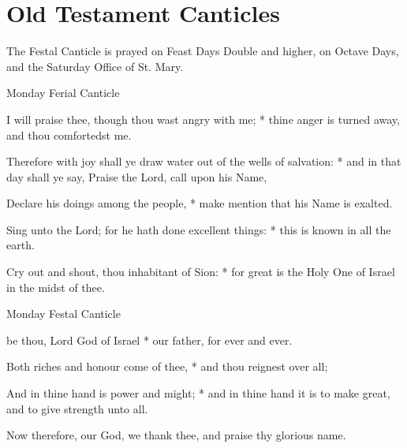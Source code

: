 \section{Old Testament Canticles}\label{OT}
\begin{rubric}
    The Festal Canticle is prayed on Feast Days Double and higher, on Octave Days, and the Saturday Office of St. Mary.
\end{rubric}
\begin{multicols}{2}
\begin{inhead}
Monday Ferial Canticle
\end{inhead}
 I will praise thee, though thou wast angry with me; * thine anger is turned away, and thou comfortedst me.\par
{}
Therefore with joy shall ye draw water out of the wells of salvation: * and in that day shall ye say, Praise the Lord, call upon his Name,\par
Declare his doings among the people, * make mention that his Name is exalted.\par
Sing unto the Lord; for he hath done excellent things: * this is known in all the earth.\par
Cry out and shout, thou inhabitant of Sion: * for great is the Holy One of Israel in the midst of thee.
\begin{inhead}
Monday Festal Canticle
\end{inhead}
 be thou, Lord God of Israel * our father, for ever and ever.\par
{}
Both riches and honour come of thee, * and thou reignest over all;\par
And in thine hand is power and might; * and in thine hand it is to make great, and to give strength unto all.\par
Now therefore, our God, we thank thee, and praise thy glorious name.
\begin{inhead}

\end{inhead}
\end{multicols}
